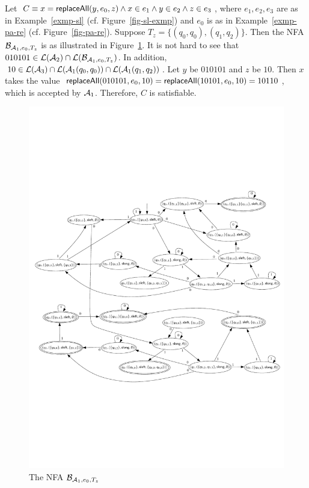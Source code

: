 \begin{example}
Let $C \equiv x = \mathsf{replaceAll}(y, e_0, z) \wedge x \in e_1 \wedge y \in e_2 \wedge z \in e_3$, where $e_1,e_2,e_3$ are as in Example~\ref{exmp-sl} (cf. Figure~\ref{fig-sl-exmp}) and $e_0$ is as in Example~\ref{exmp-pa-re} (cf. Figure~\ref{fig-pa-re}). Suppose $T_z = \{(q_0, q_0), (q_1, q_2)\}$. Then the NFA $\mathcal{B}_{\mathcal{A}_1, e_0, T_z}$ is as illustrated in Figure~\ref{fig-re-exmp}. It is not hard to see that $010101 \in \mathcal{L}(\mathcal{A}_2) \cap \mathcal{L}(\mathcal{B}_{\mathcal{A}_1, e_0, T_z})$. In addition, $10 \in \mathcal{L}(\mathcal{A}_3) \cap \mathcal{L}(\mathcal{A}_1(q_0,q_0)) \cap \mathcal{L}(\mathcal{A}_1(q_1,q_2))$. Let $y$ be $010101$ and $z$ be $10$. Then $x$ takes the value $\mathsf{replaceAll}(010101, e_0, 10)=\mathsf{replaceAll}(10101, e_0, 10)=10110$, which is accepted by $\mathcal{A}_1$. Therefore, $C$ is satisfiable.
\begin{figure}[htbp]
\begin{center}
\includegraphics[scale=0.68]{regular-expression-example-2.pdf}
\end{center}
\caption{The NFA $\mathcal{B}_{\mathcal{A}_1, e_0, T_z}$}\label{fig-re-exmp}
\end{figure} 
\end{example}

